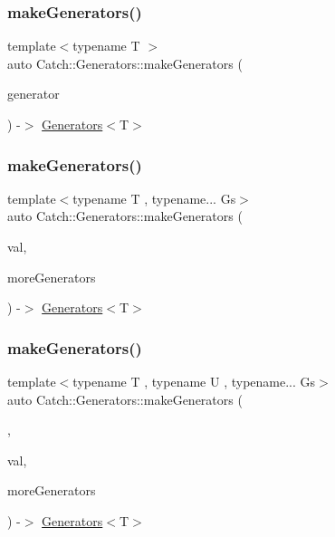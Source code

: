 \subsubsection{\texorpdfstring{makeGenerators()}{makeGenerators()}\hspace{0.1cm}{\footnotesize\ttfamily [2/4]}}
{\footnotesize\ttfamily template$<$typename T $>$ \\
auto Catch\+::\+Generators\+::make\+Generators (\begin{DoxyParamCaption}\item[{\mbox{\hyperlink{class_catch_1_1_generators_1_1_generator_wrapper}{Generator\+Wrapper}}$<$ T $>$ \&\&}]{generator }\end{DoxyParamCaption}) -\/$>$ \mbox{\hyperlink{class_catch_1_1_generators_1_1_generators}{Generators}}$<$T$>$ }

\mbox{\label{namespace_catch_1_1_generators_a0497b4463b7afee28df49631d6d75e83}} 
\subsubsection{\texorpdfstring{makeGenerators()}{makeGenerators()}\hspace{0.1cm}{\footnotesize\ttfamily [3/4]}}
{\footnotesize\ttfamily template$<$typename T , typename... Gs$>$ \\
auto Catch\+::\+Generators\+::make\+Generators (\begin{DoxyParamCaption}\item[{T \&\&}]{val,  }\item[{Gs...}]{more\+Generators }\end{DoxyParamCaption}) -\/$>$ \mbox{\hyperlink{class_catch_1_1_generators_1_1_generators}{Generators}}$<$T$>$ }

\mbox{\label{namespace_catch_1_1_generators_a4032a75da538c6897f826399368e16ed}} 
\subsubsection{\texorpdfstring{makeGenerators()}{makeGenerators()}\hspace{0.1cm}{\footnotesize\ttfamily [4/4]}}
{\footnotesize\ttfamily template$<$typename T , typename U , typename... Gs$>$ \\
auto Catch\+::\+Generators\+::make\+Generators (\begin{DoxyParamCaption}\item[{\mbox{\hyperlink{struct_catch_1_1_generators_1_1as}{as}}$<$ T $>$}]{,  }\item[{U \&\&}]{val,  }\item[{Gs...}]{more\+Generators }\end{DoxyParamCaption}) -\/$>$ \mbox{\hyperlink{class_catch_1_1_generators_1_1_generators}{Generators}}$<$T$>$ }

